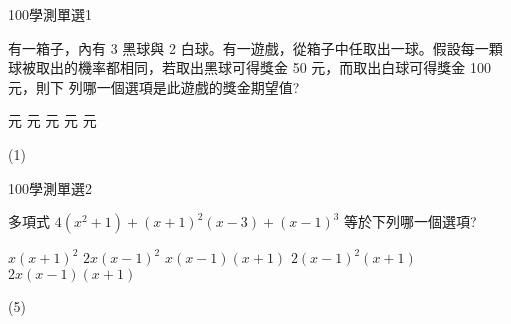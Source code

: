     \begin{QUESTION}
        \begin{ExamInfo}{100}{學測}{單選}{1}
        \end{ExamInfo}
        \begin{ExamAnsRateInfo}{85}{99}{98}{58}
        \end{ExamAnsRateInfo}
        \begin{QBODY}
            有一箱子，內有 3 黑球與 2 白球。有一遊戲，從箱子中任取出一球。假設每一顆球被取出的機率都相同，若取出黑球可得獎金 50 元，而取出白球可得獎金 100 元，則下 列哪一個選項是此遊戲的獎金期望值?
			\begin{QOPS} 
				 元
				 元 
				 元 
				 元 
				 元
			\end{QOPS}
        \end{QBODY}
        \begin{QFROMS}
        \end{QFROMS}
        \begin{QTAGS}\end{QTAGS}
        \begin{QANS}
            (1)
        \end{QANS}
        \begin{QSOLLIST}
        \end{QSOLLIST}
        \begin{QEMPTYSPACE}
        \end{QEMPTYSPACE}
    \end{QUESTION}
    \begin{QUESTION}
        \begin{ExamInfo}{100}{學測}{單選}{2}
        \end{ExamInfo}
        \begin{ExamAnsRateInfo}{72}{92}{82}{42}
        \end{ExamAnsRateInfo}
        \begin{QBODY}
            多項式 $4(x^2 +1)+(x+1)^2(x-3)+(x-1)^3$ 等於下列哪一個選項? 
			\begin{QOPS} 
				\QOP $x(x+1)^2$ 
				\QOP $2x(x-1)^2$
				\QOP $x(x-1)(x+1)$    
				\QOP  $2(x-1)^2(x+1)$    
				\QOP $2x(x-1)(x+1)$
			\end{QOPS}
        \end{QBODY}
        \begin{QFROMS}
        \end{QFROMS}
        \begin{QTAGS}\end{QTAGS}
        \begin{QANS}
            (5)
        \end{QANS}
        \begin{QSOLLIST}
        \end{QSOLLIST}
        \begin{QEMPTYSPACE}
        \end{QEMPTYSPACE}
    \end{QUESTION}
